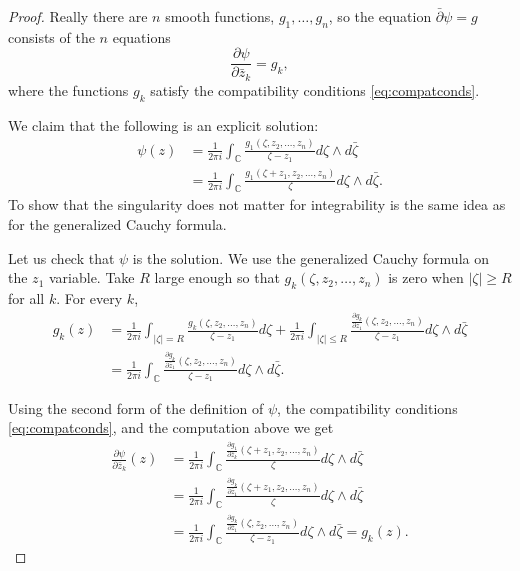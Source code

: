 \documentclass[12pt,openany]{book}
\newcommand{\sabs}[1]{\lvert {#1} \rvert}
\newcommand{\abs}[1]{\left\lvert {#1} \right\rvert}
\newcommand{\C}{{\mathbb{C}}}
\theoremstyle{plain}
\theoremstyle{remark}
\theoremstyle{definition}
\theoremstyle{exercise}
\theoremstyle{example}
\begin{document}
\begin{proof}
Really there are $n$
smooth functions, $g_1,\ldots,g_n$, so the equation $\bar{\partial} \psi = g$
consists of the $n$ equations
\begin{equation*}
\frac{\partial \psi}{\partial \bar{z}_k} = g_k ,
\end{equation*}
where the functions $g_k$ satisfy the compatibility conditions
\eqref{eq:compatconds}.

We claim that the following is an explicit solution:
\begin{equation*}
\begin{split}
\psi(z)
& =
\frac{1}{2\pi i}
\int_\C
\frac{
 g_1(\zeta,z_2,\ldots,z_n)
}{\zeta - z_1}
d\zeta \wedge d\bar{\zeta}
\\
& =
\frac{1}{2\pi i}
\int_\C
\frac{
 g_1(\zeta+z_1,z_2,\ldots,z_n)
}{\zeta}
d\zeta \wedge d\bar{\zeta} .
\end{split}
\end{equation*}
To show that the singularity does not matter for integrability is the same
idea as for the generalized Cauchy formula.

Let us check that $\psi$ is the solution.
We use the generalized Cauchy formula on the $z_1$
variable.
Take $R$ large enough so that
$g_k(\zeta,z_2,\ldots,z_n)$ is zero when $\sabs{\zeta}\geq R$ for all $k$.
For every $k$,
\begin{equation*}
\begin{split}
g_k(z) & =
\frac{1}{2\pi i}
\int_{\abs{\zeta}=R}
\frac{g_k(\zeta,z_2,\ldots,z_n)}{\zeta-z_1}
d \zeta
+
\frac{1}{2\pi i}
\int_{\abs{\zeta} \leq R}
\frac{\frac{\partial g_k}{\partial \bar{z}_1}(\zeta,z_2,\ldots,z_n)}{\zeta-z_1}
d\zeta \wedge d\bar{\zeta}
\\
& =
\frac{1}{2\pi i}
\int_{\C}
\frac{\frac{\partial g_k}{\partial \bar{z}_1}(\zeta,z_2,\ldots,z_n)}{\zeta-z_1}
d\zeta \wedge d\bar{\zeta}  .
\end{split}
\end{equation*}

Using the second form of the definition of $\psi$, the
compatibility conditions \eqref{eq:compatconds}, and the computation above we get
\begin{equation*}
\begin{split}
\frac{\partial\psi}{\partial \bar{z}_k}(z)
& =
\frac{1}{2\pi i}
\int_\C
\frac{
 \frac{\partial g_1}{\partial \bar{z}_k}(\zeta+z_1,z_2,\ldots,z_n)
}{\zeta}
d\zeta \wedge d\bar{\zeta}
\\
& =
\frac{1}{2\pi i}
\int_\C
\frac{
 \frac{\partial g_k}{\partial \bar{z}_1}(\zeta+z_1,z_2,\ldots,z_n)
}{\zeta}
d\zeta \wedge d\bar{\zeta}
\\
& =
\frac{1}{2\pi i}
\int_\C
\frac{
 \frac{\partial g_k}{\partial \bar{z}_1}(\zeta,z_2,\ldots,z_n)
}{\zeta-z_1}
d\zeta \wedge d\bar{\zeta}
=
g_k(z) .
\end{split}
\end{equation*}


\end{proof}
\end{document}
